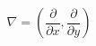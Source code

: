 \documentclass[preview,border=2pt]{standalone}
\begin{document}
\[
\nabla = \left(\frac{\partial}{\partial x},\frac{\partial}{\partial y}\right)
\]
\end{document}
